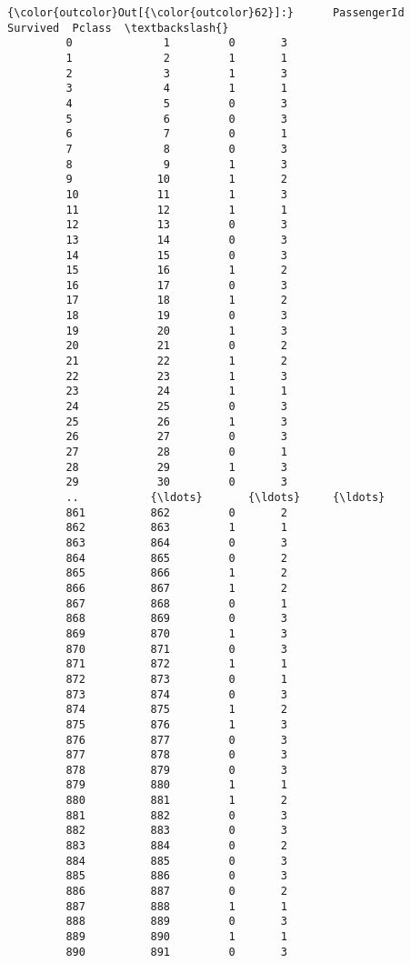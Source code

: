 \documentclass[11pt]{article}
\begin{document}
\begin{Verbatim}[commandchars=\\\{\}]
{\color{outcolor}Out[{\color{outcolor}62}]:}      PassengerId  Survived  Pclass  \textbackslash{}
         0              1         0       3   
         1              2         1       1   
         2              3         1       3   
         3              4         1       1   
         4              5         0       3   
         5              6         0       3   
         6              7         0       1   
         7              8         0       3   
         8              9         1       3   
         9             10         1       2   
         10            11         1       3   
         11            12         1       1   
         12            13         0       3   
         13            14         0       3   
         14            15         0       3   
         15            16         1       2   
         16            17         0       3   
         17            18         1       2   
         18            19         0       3   
         19            20         1       3   
         20            21         0       2   
         21            22         1       2   
         22            23         1       3   
         23            24         1       1   
         24            25         0       3   
         25            26         1       3   
         26            27         0       3   
         27            28         0       1   
         28            29         1       3   
         29            30         0       3   
         ..           {\ldots}       {\ldots}     {\ldots}   
         861          862         0       2   
         862          863         1       1   
         863          864         0       3   
         864          865         0       2   
         865          866         1       2   
         866          867         1       2   
         867          868         0       1   
         868          869         0       3   
         869          870         1       3   
         870          871         0       3   
         871          872         1       1   
         872          873         0       1   
         873          874         0       3   
         874          875         1       2   
         875          876         1       3   
         876          877         0       3   
         877          878         0       3   
         878          879         0       3   
         879          880         1       1   
         880          881         1       2   
         881          882         0       3   
         882          883         0       3   
         883          884         0       2   
         884          885         0       3   
         885          886         0       3   
         886          887         0       2   
         887          888         1       1   
         888          889         0       3   
         889          890         1       1   
         890          891         0       3   
         

\end{Verbatim}
\end{document}
